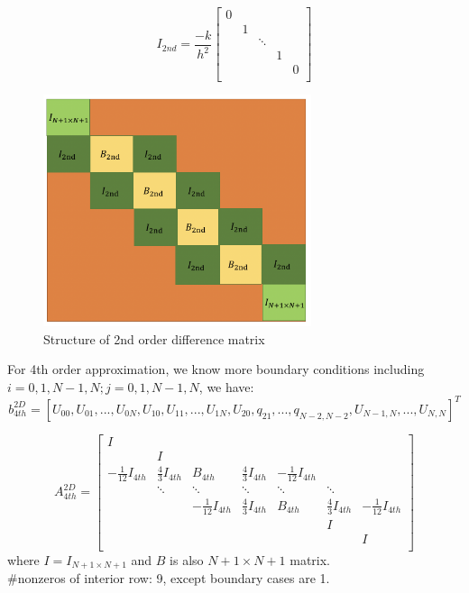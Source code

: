 \documentclass[a4paper]{article}
\begin{document}
\[
I_{2nd} = \frac{-k}{h^2}
\begin{bmatrix}
    0\\
      &1&  &   &     \\
    
     & & \ddots  \\
     &  &  &1 \\
     &  &   & & 0\\
\end{bmatrix}
\]

\begin{figure}[htbp]
\centering
\includegraphics[width=0.7\textwidth]{2nd.png}
\caption{\label{2nd}Structure of 2nd order difference matrix}
\end{figure}

For 4th order approximation, we know more boundary conditions including $i=0,1,N-1,N;j=0,1,N-1,N$, we have:
$$b_{4th}^{2D} = [U_{00}, U_{01},..., U_{0N}, U_{10}, U_{11},...,U_{1N},U_{20},q_{21},...,q_{N-2,N-2},U_{N-1,N},...,U_{N,N} ]^T $$

\[
A_{4th}^{2D}
= 
\begin{bmatrix}
     I &  &   &   &  &\\
      &I &   &   &  &\\
    -\frac{1}{12}I_{4th}& \frac{4}{3}I_{4th} & B_{4th} & \frac{4}{3}I_{4th} & -\frac{1}{12}I_{4th} \\
      &\ddots& \ddots & \ddots & \ddots & \ddots& \\
     &&-\frac{1}{12}I_{4th}& \frac{4}{3}I_{4th} & B_{4th} & \frac{4}{3}I_{4th} & -\frac{1}{12}I_{4th} \\
     & & & & &    I \\
     & & &  & &  &  I  \\
\end{bmatrix}
\]
where $I=I_{N+1\times N+1}$ and $B$ is also $N+1 \times N+1$ matrix.\\
\#nonzeros of interior row: 9, except boundary cases are 1.
\end{document}
